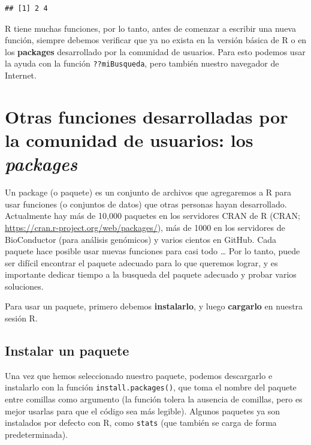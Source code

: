 \documentclass[
]{book}
\begin{document}
\begin{verbatim}
## [1] 2 4
\end{verbatim}

R tiene muchas funciones, por lo tanto, antes de comenzar a escribir una nueva función, siempre debemos verificar que ya no exista en la versión básica de R o en los \textbf{packages} desarrollado por la comunidad de usuarios. Para esto podemos usar la ayuda con la función \texttt{??miBusqueda}, pero también nuestro navegador de Internet.

\hypertarget{otras-funciones-desarrolladas-por-la-comunidad-de-usuarios-los-packages}{%
\section{\texorpdfstring{Otras funciones desarrolladas por la comunidad de usuarios: los \emph{packages}}{Otras funciones desarrolladas por la comunidad de usuarios: los packages}}\label{otras-funciones-desarrolladas-por-la-comunidad-de-usuarios-los-packages}}

Un package (o paquete) es un conjunto de archivos que agregaremos a R para usar funciones (o conjuntos de datos) que otras personas hayan desarrollado. Actualmente hay más de 10,000 paquetes en los servidores CRAN de R (CRAN; \url{https://cran.r-project.org/web/packages/}), más de 1000 en los servidores de BioConductor (para análisis genómicos) y varios cientos en GitHub. Cada paquete hace posible usar nuevas funciones para casi todo \ldots{} Por lo tanto, puede ser difícil encontrar el paquete adecuado para lo que queremos lograr, y es importante dedicar tiempo a la busqueda del paquete adecuado y probar varios soluciones.

Para usar un paquete, primero debemos \textbf{instalarlo}, y luego \textbf{cargarlo} en nuestra sesión R.

\hypertarget{instalar-un-paquete}{%
\subsection{Instalar un paquete}\label{instalar-un-paquete}}

Una vez que hemos seleccionado nuestro paquete, podemos descargarlo e instalarlo con la función \texttt{install.packages()}, que toma el nombre del paquete entre comillas como argumento (la función tolera la ausencia de comillas, pero es mejor usarlas para que el código sea más legible). Algunos paquetes ya son instalados por defecto con R, como \texttt{stats} (que también se carga de forma predeterminada).
\end{document}
